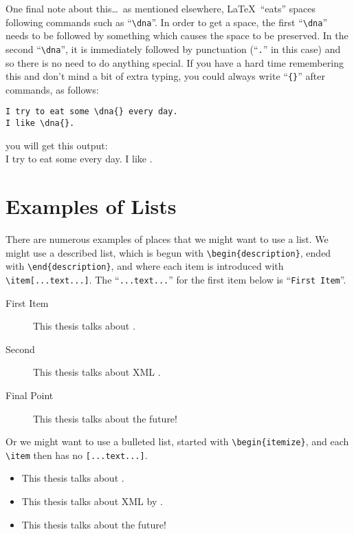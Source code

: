 One final note about this\dots\ as mentioned elsewhere,
\LaTeX\ ``eats'' spaces following commands such as ``\verb|\dna|''.
In order to get a space, the first ``\verb|\dna|'' needs to be
followed by something which causes the space to be preserved.  In the
second ``\verb|\dna|'', it is immediately followed by punctuation
(``\verb|.|'' in this case) and so there is no need to do anything
special.  If you have a hard time remembering this and don't mind a
bit of extra typing, you could always write ``\verb|{}|'' after
commands, as follows:

\begin{verbatim}
I try to eat some \dna{} every day.
I like \dna{}.
\end{verbatim}
you will get this output:\\
I try to eat some \dna{} every day.
I like \dna{}.





\section{Examples of Lists}
\label{sec:LISTS}
There are numerous examples of places that we might want to use a
list.  We might use a described list, which is begun with
\verb|\begin{description}|, ended with \verb|\end{description}|, and
where each item is introduced with \verb|\item[...text...]|.  The
``\verb|...text...|'' for the first item below is ``\verb|First Item|''.
\begin{description}
    \item[First Item] This thesis talks about \sysacro.
    \item[Second] This thesis talks about XML \citep{1188581}.
    \item[Final Point]  This thesis talks about the future!
\end{description}

\noindent Or we might want to use a bulleted list, started with
\verb|\begin{itemize}|, and each \verb|\item| then has no
\verb|[...text...]|.

\begin{itemize}
    \item This thesis talks about \sysacro.
    \item This thesis talks about XML \citep{1188581} by \citealt{1188581}.
    \item This thesis talks about the future!
\end{itemize}

